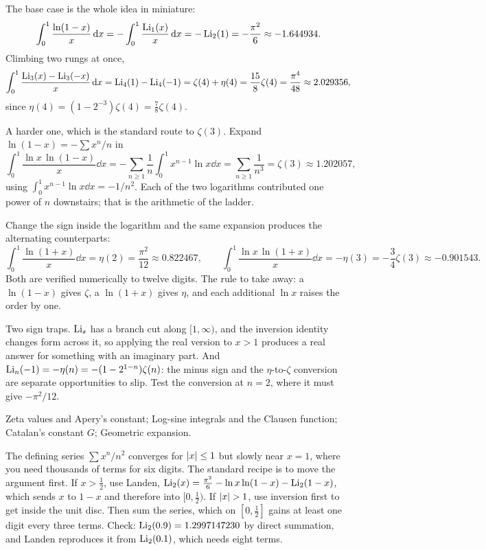 \begin{worked}
The base case is the whole idea in miniature:
\[\int_0^1\frac{\ln(1-x)}{x}\,\mathrm{d} x=-\int_0^1\frac{\operatorname{Li}_1(x)}{x}\,\mathrm{d} x=-\operatorname{Li}_2(1)=-\frac{\pi^{2}}{6}\approx-1.644934.\]
Climbing two rungs at once,
\[\int_0^1\frac{\operatorname{Li}_3(x)-\operatorname{Li}_3(-x)}{x}\,\mathrm{d} x=\operatorname{Li}_4(1)-\operatorname{Li}_4(-1)=\zeta(4)+\eta(4)=\frac{15}{8}\zeta(4)=\frac{\pi^{4}}{48}\approx2.029356,\]
since $\eta(4)=(1-2^{-3})\zeta(4)=\tfrac78\zeta(4)$.

A harder one, which is the standard route to $\zeta(3)$. Expand $\ln(1-x)=-\sum x^{n}/n$ in
\[\int_0^1\frac{\ln x\,\ln(1-x)}{x}\dd x=-\sum_{n\geq1}\frac1n\int_0^1x^{n-1}\ln x\dd x=\sum_{n\geq1}\frac{1}{n^{3}}=\zeta(3)\approx1.202057,\]
using $\int_0^1x^{n-1}\ln x\dd x=-1/n^{2}$. Each of the two logarithms contributed one power of $n$ downstairs; that is the arithmetic of the ladder.

Change the sign inside the logarithm and the same expansion produces the alternating counterparts:
\[\int_0^1\frac{\ln(1+x)}{x}\dd x=\eta(2)=\frac{\pi^{2}}{12}\approx0.822467,\qquad
\int_0^1\frac{\ln x\,\ln(1+x)}{x}\dd x=-\eta(3)=-\frac34\zeta(3)\approx-0.901543.\]
Both are verified numerically to twelve digits. The rule to take away: a $\ln(1-x)$ gives $\zeta$, a $\ln(1+x)$ gives $\eta$, and each additional $\ln x$ raises the order by one.
\end{worked}

\begin{trap}
Two sign traps. $\operatorname{Li}_s$ has a branch cut along $[1,\infty)$, and the inversion identity changes form across it, so applying the real version to $x>1$ produces a real answer for something with an imaginary part. And $\operatorname{Li}_n(-1)=-\eta(n)=-(1-2^{1-n})\zeta(n)$: the minus sign and the $\eta$-to-$\zeta$ conversion are separate opportunities to slip. Test the conversion at $n=2$, where it must give $-\pi^{2}/12$.
\end{trap}

\begin{seealsob}Zeta values and Apery's constant; Log-sine integrals and the Clausen function; Catalan's constant $G$; Geometric expansion.\end{seealsob}

\begin{keynote}
The defining series $\sum x^{n}/n^{2}$ converges for $\left\lvert x\right\rvert\leq1$ but slowly near $x=1$, where you need thousands of terms for six digits. The standard recipe is to move the argument first. If $x>\tfrac12$, use Landen, $\operatorname{Li}_2(x)=\tfrac{\pi^{2}}{6}-\ln x\ln(1-x)-\operatorname{Li}_2(1-x)$, which sends $x$ to $1-x$ and therefore into $[0,\tfrac12)$. If $\left\lvert x\right\rvert>1$, use inversion first to get inside the unit disc. Then sum the series, which on $[0,\tfrac12]$ gains at least one digit every three terms. Check: $\operatorname{Li}_2(0.9)=1.2997147230$ by direct summation, and Landen reproduces it from $\operatorname{Li}_2(0.1)$, which needs eight terms.
\end{keynote}

